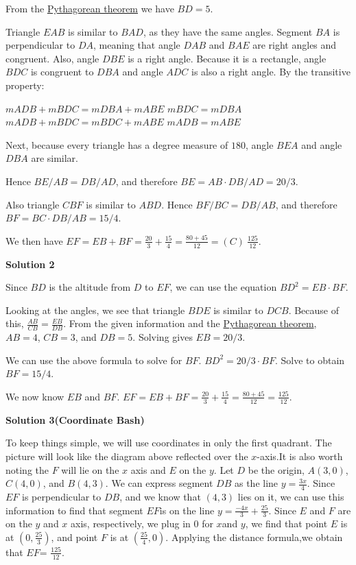 \begin{enumerate}
 From the \href{https://artofproblemsolving.com/wiki/index.php?title=Pythagorean\_theorem}{Pythagorean theorem} we have $BD=5$.

 Triangle $EAB$ is similar to $BAD$, as they have the same angles. Segment $BA$ is perpendicular to $DA$, meaning that angle $DAB$ and $BAE$ are right angles and congruent. Also, angle $DBE$ is a right angle. Because it is a rectangle, angle $BDC$ is congruent to $DBA$ and angle $ADC$ is also a right angle. By the transitive property:

 $mADB + mBDC = mDBA + mABE$
$mBDC = mDBA$
$mADB + mBDC = mBDC + mABE$
$mADB = mABE$

 Next, because every triangle has a degree measure of $180$, angle $BEA$ and angle $DBA$ are similar. 

 
Hence $BE/AB = DB/AD$, and therefore $BE = AB\cdot DB/AD = 20/3$.

 Also triangle $CBF$ is similar to $ABD$. Hence $BF/BC = DB/AB$, and therefore $BF=BC\cdot DB / AB = 15/4$.

 We then have $EF = EB+BF = \frac{20}3 + \frac{15}4 = \frac{80 + 45}{12} = \boxed{(C)\ \frac{125}{12}}$.

 



\textbf{Solution 2}

Since $BD$ is the altitude from $D$ to $EF$, we can use the equation $BD^2 = EB\cdot BF$. 

 Looking at the angles, we see that triangle $BDE$ is similar to $DCB$. Because of this, $\frac{AB}{CB} = \frac{EB}{DB}$. From the given information and the \href{https://artofproblemsolving.com/wiki/index.php?title=Pythagorean\_theorem}{Pythagorean theorem}, $AB=4$, $CB=3$, and $DB=5$. Solving gives $EB=20/3$. 

 We can use the above formula to solve for $BF$. $BD^2 = 20/3\cdot BF$. Solve to obtain $BF=15/4$. 

 We now know $EB$ and $BF$. $EF = EB+BF = \frac{20}3 + \frac{15}4 = \frac{80 + 45}{12} = \boxed{\frac{125}{12}}$.

 



\textbf{Solution 3(Coordinate Bash)}

To keep things simple, we will use coordinates in only the first quadrant. The picture will look like the diagram above reflected over the $x$-axis.It is also worth noting the $F$ will lie on the $x$ axis and $E$ on the $y$. Let $D$ be the origin, $A(3,0)$, $C(4,0)$, and  $B(4,3)$. We can express segment $DB$ as the line $y=\frac{3x}{4}$. Since $EF$ is perpendicular to $DB$, and we know that $(4,3)$ lies on it, we can use this information to find that segment $EF$is on the line $y=\frac{-4x}{3}+\frac{25}{3}$. Since $E$ and $F$ are on the $y$ and $x$ axis, respectively, we plug in $0$ for $x$and $y$, we find that point $E$ is at $(0,\frac{25}{3})$, and point $F$ is at $(\frac{25}{4},0)$. Applying the distance formula,we obtain that $EF$= $\boxed{\frac{125}{12}}$.


\end{enumerate}
